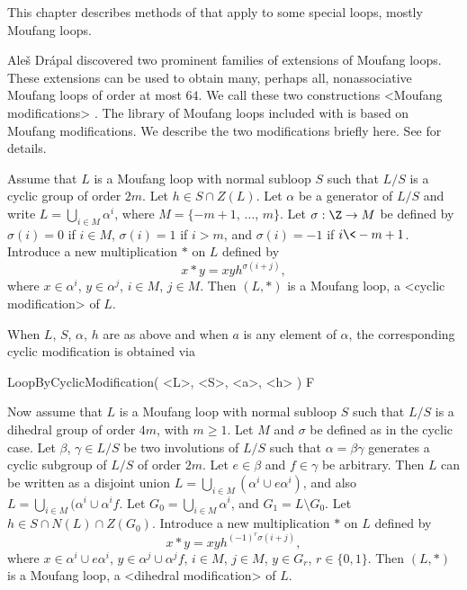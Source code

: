 
This chapter describes methods of {\LOOPS} that apply to some
special loops, mostly Moufang loops.


Ale\v{s} Dr\'apal discovered two prominent families of extensions of Moufang
loops. These extensions can be used to obtain many, perhaps all, nonassociative
Moufang loops of order at most $64$. We call these two constructions
<Moufang modifications>
%
%
. The library of Moufang loops included with
{\LOOPS} is based on Moufang modifications. We describe the two modifications
briefly here. See \cite{DV} for details.

Assume that $L$ is a Moufang loop with normal subloop $S$ such that $L/S$ is a
cyclic group of order $2m$. Let $h\in S\cap Z(L)$. Let $\alpha$ be a generator
of $L/S$ and write $L = \bigcup_{i\in M} \alpha^i$, where $M=\{-m+1$, $\dots$,
$m\}$. Let $\sigma:\Z\to M$ be defined by $\sigma(i)=0$ if $i\in M$,
$\sigma(i)=1$ if $i>m$, and $\sigma(i)=-1$ if $i\<-m+1$. Introduce a new
multiplication $\ast$ on $L$ defined by
$$
    x\ast y = xyh^{\sigma(i+j)},
$$
where $x\in \alpha^i$, $y\in\alpha^j$, $i\in M$, $j\in M$. Then $(L,\ast)$ is a
Moufang loop, a <cyclic modification>
%
%
 of $L$.

When $L$, $S$, $\alpha$, $h$ are as above and when $a$ is any element of
$\alpha$, the corresponding cyclic modification is obtained via

\>LoopByCyclicModification( <L>, <S>, <a>, <h> ) F

Now assume that $L$ is a Moufang loop with normal subloop $S$ such that $L/S$
is a dihedral group of order $4m$, with $m\ge 1$. Let $M$ and $\sigma$ be
defined as in the cyclic case. Let $\beta$, $\gamma\in L/S$ be two involutions
of $L/S$ such that $\alpha=\beta\gamma$ generates a cyclic subgroup of $L/S$ of
order $2m$. Let $e\in\beta$ and $f\in\gamma$ be arbitrary. Then $L$ can be
written as a disjoint union $L=\bigcup_{i\in M}(\alpha^i\cup e\alpha^i)$, and
also $L=\bigcup_{i\in M}(\alpha^i\cup \alpha^if$. Let $G_0=\bigcup_{i\in
M}\alpha^i$, and $G_1=L\setminus G_0$. Let $h\in S\cap N(L)\cap Z(G_0)$.
Introduce a new multiplication $\ast$ on $L$ defined by
$$
    x\ast y = xyh^{(-1)^r\sigma(i+j)},
$$
where $x\in\alpha^i\cup e\alpha^i$, $y\in\alpha^j\cup \alpha^jf$, $i\in M$,
$j\in M$, $y\in G_r$, $r\in\{0,1\}$. Then $(L,\ast)$ is a Moufang loop, a
<dihedral modification>
%
%
 of $L$.

